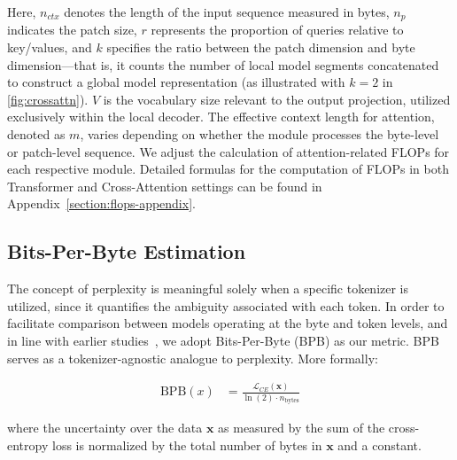Here, $n_{ctx}$ denotes the length of the input sequence measured in bytes, $n_p$ indicates the patch size, $r$ represents the proportion of queries relative to key/values, and $k$ specifies the ratio between the patch dimension and byte dimension—that is, it counts the number of local model segments concatenated to construct a global model representation (as illustrated with $k=2$ in \autoref{fig:crossattn}). $V$ is the vocabulary size relevant to the output projection, utilized exclusively within the local decoder. The effective context length for attention, denoted as $m$, varies depending on whether the module processes the byte-level or patch-level sequence. We adjust the calculation of attention-related FLOPs for each respective module. Detailed formulas for the computation of FLOPs in both Transformer and Cross-Attention settings can be found in Appendix~\ref{section:flops-appendix}.

\subsection{Bits-Per-Byte Estimation} The concept of perplexity is meaningful solely when a specific tokenizer is utilized, since it quantifies the ambiguity associated with each token. In order to facilitate comparison between models operating at the byte and token levels, and in line with earlier studies~\citep{xue2022byt5, yu2023megabyte, wang2024mambabyte}, we adopt Bits-Per-Byte (BPB) as our metric. BPB serves as a tokenizer-agnostic analogue to perplexity. More formally:

\begin{align}
    \text{BPB}(x)&= \frac{\mathcal{L}_{CE}(\pmb{x})}{\ln(2)\cdot n_{\text{bytes}}}
\end{align}

where the uncertainty over the data $\pmb{x}$ as measured by the sum of the cross-entropy loss is normalized by the total number of bytes in $\pmb{x}$ and a constant. 

